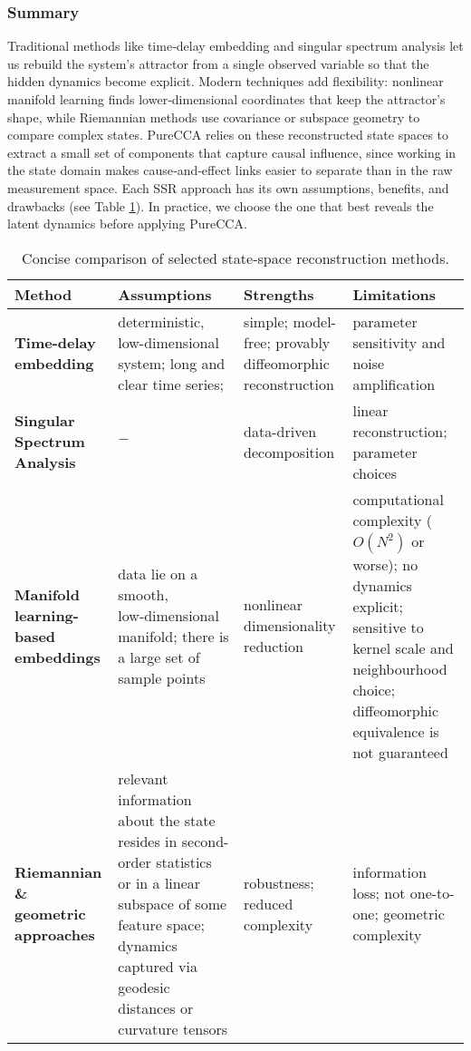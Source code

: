 \documentclass[14pt]{extarticle}
\begin{document}
	\subsubsection*{Summary}
	
	Traditional methods like time‐delay embedding and singular spectrum analysis let us rebuild the system’s attractor from a single observed variable so that the hidden dynamics become explicit.  
	Modern techniques add flexibility: nonlinear manifold learning finds lower‐dimensional coordinates that keep the attractor’s shape, while Riemannian methods use covariance or subspace geometry to compare complex states.  
	PureCCA relies on these reconstructed state spaces to extract a small set of components that capture causal influence, since working in the state domain makes cause‐and‐effect links easier to separate than in the raw measurement space.  
	Each SSR approach has its own assumptions, benefits, and drawbacks (see Table \ref{tab:ssr_selected}). In practice, we choose the one that best reveals the latent dynamics before applying PureCCA.
	
	\begin{table}[bhtp]
		\centering
		\renewcommand{\arraystretch}{1.25} %
		\begin{tabularx}{\textwidth}{
				>{\raggedright\arraybackslash}p{3.3cm}   %
				>{\raggedright\arraybackslash}X           %
				>{\raggedright\arraybackslash}X           %
				>{\raggedright\arraybackslash}X}          %
			\toprule
			\textbf{Method} & \textbf{Assumptions} & \textbf{Strengths} & \textbf{Limitations} \\
			\midrule
			\textbf{Time-delay embedding} &
			deterministic, low-dimensional system; long and clear time series;  &
			simple; model-free; provably diffeomorphic reconstruction &
			parameter sensitivity and noise amplification \\[0.3em] \hline
			
			\textbf{Singular Spectrum Analysis} &
			$-$ &
			data-driven decomposition &
			linear reconstruction; parameter choices \\[0.3em] \hline
			
			\textbf{Manifold learning-based embeddings} &
			data lie on a smooth, low‑dimensional manifold; there is a large set of sample points &
			nonlinear dimensionality reduction &
			computational complexity ($O(N^2)$ or worse); no dynamics explicit; sensitive to kernel scale and neighbourhood choice; diffeomorphic equivalence is not guaranteed \\[0.3em] \hline
			
			\textbf{Riemannian \& geometric approaches} &
			relevant information about the state resides in second-order statistics or in a linear subspace of some feature space; dynamics captured via geodesic distances or curvature tensors &
			robustness; reduced complexity &
			information loss; not one-to-one; geometric complexity \\
			\bottomrule
		\end{tabularx}
		\caption{Concise comparison of selected state‑space reconstruction methods.}
		\label{tab:ssr_selected}
	\end{table}
	
\end{document}
